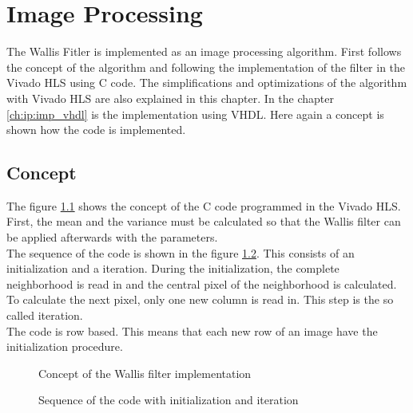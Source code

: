 %
%
\chapter{Image Processing}  \label{chapt:image_processing}
The Wallis Fitler is implemented as an image processing algorithm. First follows the concept of the algorithm and following the implementation of the filter in the Vivado HLS using C code. The simplifications and optimizations of the algorithm with Vivado HLS are also explained in this chapter. In the chapter \ref{ch:ip:imp_vhdl} is the implementation using VHDL. Here again a concept is shown how the code is implemented.

\section{Concept}
The figure \ref{fig:concept} shows the concept of the C code programmed in the Vivado HLS. First, the mean and the variance must be calculated so that the Wallis filter can be applied afterwards with the parameters. \\
The sequence of the code is shown in the figure \ref{fig:sequence}. This consists of an initialization and a iteration. During the initialization, the complete neighborhood is read in and the central pixel of the neighborhood is calculated. To calculate the next pixel, only one new column is read in. This step is the so called iteration.\\
The code is row based. This means that each new row of an image have the initialization procedure.

\begin{figure}[tb!]
    \centering
    \begin{adjustbox}{max width=\textwidth}
    \end{adjustbox}
    \caption{Concept of the Wallis filter implementation}
    \label{fig:concept}
\end{figure}

\begin{figure}[tb!]
    \centering
    \begin{adjustbox}{max width=\textwidth}
    \end{adjustbox}
    \caption{Sequence of the code with initialization and iteration}
    \label{fig:sequence}
\end{figure}


